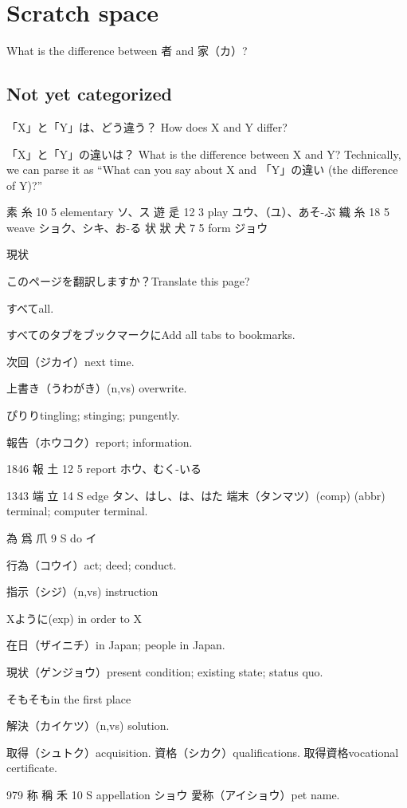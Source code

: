 \chapter{Scratch space}

What is the difference between 者 and 家（カ）?

\section{Not yet categorized}

「X」と「Y」は、どう違う？
How does X and Y differ?

「X」と「Y」の違いは？
What is the difference between X and Y?
Technically, we can parse it as
``What can you say about X and 「Y」の違い (the difference of Y)?''

素  糸 10 5  elementary ソ、ス
遊  辵 12 3  play ユウ、（ユ）、あそ-ぶ
織  糸 18 5  weave ショク、シキ、お-る
状 狀 犬 7 5  form ジョウ

現状

このページを翻訳しますか？Translate this page?

すべてall.

すべてのタブをブックマークにAdd all tabs to bookmarks.

次回（ジカイ）next time.

上書き（うわがき）(n,vs) overwrite.

ぴりりtingling; stinging; pungently.

報告（ホウコク）report; information.

1846 報  土 12 5  report ホウ、むく-いる

1343 端  立 14 S  edge タン、はし、は、はた
端末（タンマツ）(comp) (abbr) terminal; computer terminal.

為 爲 爪 9 S  do イ

行為（コウイ）act; deed; conduct.

指示（シジ）(n,vs) instruction

Xように(exp) in order to X

在日（ザイニチ）in Japan; people in Japan.

現状（ゲンジョウ）present condition; existing state; status quo.

そもそもin the first place

解決（カイケツ）(n,vs) solution.

取得（シュトク）acquisition.
資格（シカク）qualifications.
取得資格vocational certificate.

979	称	稱	禾	10	S		appellation	ショウ
愛称（アイショウ）pet name.

